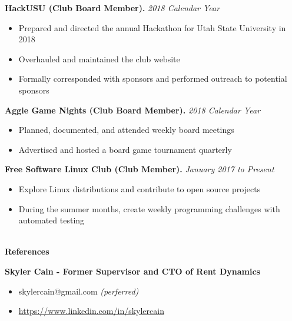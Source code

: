 \documentclass[letterpaper,11pt]{article}
\begin{document}
\textbf{HackUSU (Club Board Member).} \textit{2018 Calendar Year}
\begin{itemize}[noitemsep,topsep=0pt]
	\item Prepared and directed the annual Hackathon for Utah State University in 2018
	\item Overhauled and maintained the club website
	\item Formally corresponded with sponsors and performed outreach to potential sponsors\\
\end{itemize}

\textbf{Aggie Game Nights (Club Board Member).} \textit{2018 Calendar Year}
\begin{itemize}[noitemsep,topsep=0pt]
	\item Planned, documented, and attended weekly board meetings
	\item Advertised and hosted a board game tournament quarterly\\
\end{itemize}

\textbf{Free Software Linux Club (Club Member).} \textit{January 2017 to Present}
\begin{itemize}[noitemsep,topsep=0pt]
	\item Explore Linux distributions and contribute to open source projects
	\item During the summer months, create weekly programming challenges with automated testing
\end{itemize}



\begin{Large}\textbf{\\References}\end{Large}

\textbf{Skyler Cain - Former Supervisor and CTO of Rent Dynamics}
\begin{itemize}[noitemsep,topsep=0pt]
	\item skylercain@gmail.com \textit{(perferred)}
	\item \url{https://www.linkedin.com/in/skylercain}\\
\end{itemize}
\end{document}
